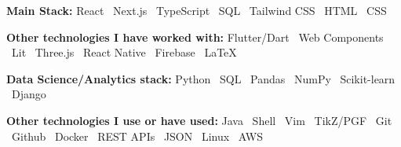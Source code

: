 \documentclass[12pt]{extarticle}
\renewcommand{\_}{\leavevmode\kern.06em\vbox{\hrule width.425em}}
\begin{document}
\vspace{0.2cm}

\textbf{Main Stack:} React \textbullet\ Next.js \textbullet\ TypeScript \textbullet\ SQL \textbullet\ Tailwind CSS \textbullet\ HTML \textbullet\ CSS

\vspace{0.2cm}

\textbf{Other technologies I have worked with:} Flutter/Dart \textbullet\ Web Components \textbullet\ Lit \textbullet\ Three.js \textbullet\ React Native \textbullet\ Firebase \textbullet\ \LaTeX

\vspace{0.2cm}

\textbf{Data Science/Analytics stack:} Python \textbullet\ SQL \textbullet\ Pandas \textbullet\ NumPy \textbullet\ Scikit-learn \textbullet\ Django

\vspace{0.2cm}

\textbf{Other technologies I use or have used:} Java \textbullet\ Shell \textbullet\ Vim \textbullet\ TikZ/PGF \textbullet\ Git \textbullet\ Github \textbullet\ Docker \textbullet\ REST APIs \textbullet\ JSON \textbullet\ Linux \textbullet\ AWS
\end{document}
